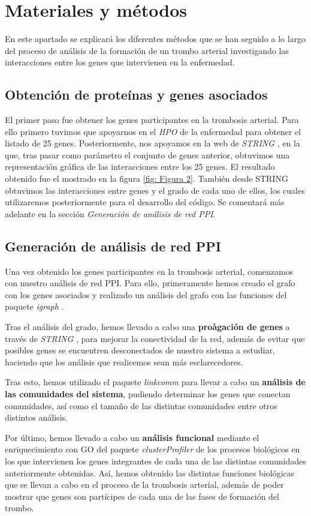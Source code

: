 \section{Materiales y métodos}

En este apartado se explicará los diferentes métodos que se han seguido a lo largo del proceso de análisis de la formación de un trombo arterial investigando las interacciones entre los genes que intervienen en la enfermedad.

\subsection{Obtención de proteínas y genes asociados}

El primer paso fue obtener los genes participantes en la trombosis arterial. Para ello primero tuvimos que apoyarnos en el \textit{HPO} de la enfermedad \cite{HPO} para obtener el listado de 25 genes. Posteriormente, nos apoyamos en la web de \textit{STRING} \cite{STRING} , en la que, tras pasar como parámetro el conjunto de genes anterior, obtuvimos una representación gráfica de las interacciones entre los 25 genes. El resultado obtenido fue el mostrado en la figura \ref{fig: Figura 2}. También desde STRING obtuvimos las interacciones entre genes y el grado de cada uno de ellos, los cuales utilizaremos posteriormente para el desarrollo del código. Se comentará más adelante en la sección \textit{Generación de análisis de red PPI}. \\


	
\subsection{Generación de análisis de red PPI}
Una vez obtenido los genes participantes en la trombosis arterial, comenzamos con nuestro análisis de red PPI. Para ello, primeramente hemos creado el grafo con los genes asociados y realizado un análisis del grafo con las funciones del paquete \textit{igraph} \cite{igraph}. 

Tras el análisis del grado, hemos llevado a cabo una \textbf{proàgación de genes} a través de \textit{STRING} \cite{STRING}, para mejorar la conectividad de la red, además de evitar que posibles genes se encuentren desconectados de nuestro sistema a estudiar, haciendo que los análisis que realicemos sean más esclarecedores.  

Tras esto, hemos utilizado el paquete \textit{linkcomm} \cite{linkcomm} para llevar a cabo un \textbf{análisis de las comunidades del sistema}, pudiendo determinar los genes que conectan comunidades, así como el tamaño de las distintas comunidades entre otros distintos análisis.

Por último, hemos llevado a cabo un \textbf{análisis funcional} mediante el enriquecimiento con GO del paquete \textit{clusterProfiler} \cite{clusterProfiler} de los procesos biológicos en los que intervienen los genes integrantes de cada una de las distintas comunidades anteriormente obtenidas.  Así, hemos obtenido las distintas funciones biológicas que se llevan a cabo en el proceso de la trombosis arterial, además de poder mostrar que genes son partícipes de cada una de las fases de formación del trombo.
